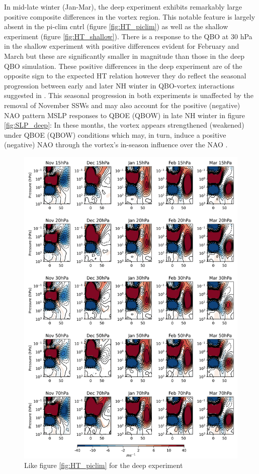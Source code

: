 In mid-late winter (Jan-Mar), the deep experiment exhibits remarkably large positive composite differences in the vortex region. This notable feature is largely absent in the pi-clim cntrl (figure \ref{fig:HT_piclim}) as well as the shallow experiment (figure \ref{fig:HT_shallow}). There is a response to the QBO at 30 hPa in the shallow experiment with positive differences evident for February and March but these are significantly smaller in magnitude than those in the deep QBO simulation. These positive differences in the deep experiment are of the opposite sign to the expected HT relation however they do reflect the seasonal progression between early and later NH winter in QBO-vortex interactions suggested in \cite{graySurface2018b}. This seasonal progression in both experiments is unaffected by the removal of November SSWs and may also account for the positive (negative) NAO pattern MSLP responses to QBOE (QBOW) in late NH winter in figure \ref{fig:SLP_deep}: In these months, the vortex appears strengthened (weakened) under QBOE (QBOW) conditions which may, in turn, induce a positive (negative) NAO through the vortex's in-season influence over the NAO \citep{baldwinStratospheric2001a, charlton-perezInfluence2018e}. 

\newpage
\begin{figure}[h!]
\begin{center}
\noindent\includegraphics[width = 0.9\linewidth]{Figures/Figures-deepQBO/ZMZW_composites_by_month_QBO_phases_U_d_higher_MarQBO_vs_Mar_70hPa_5thresh.png}
\caption[ZMZW composites under QBO phases in the deep QBO simulation]{Like figure \ref{fig:HT_piclim} for the deep experiment}
\label{fig:HT_deep}
\end{center}
\end{figure}
\newpage 

